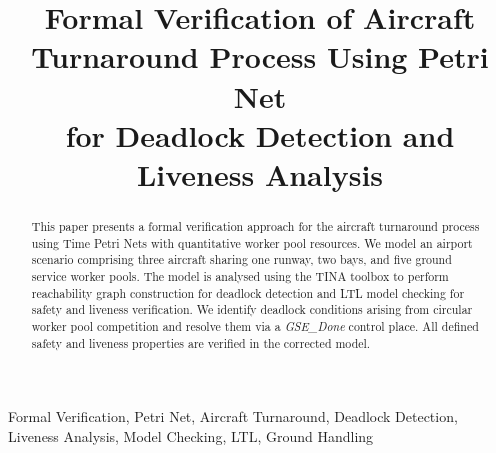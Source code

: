 \documentclass[conference]{IEEEtran}
\begin{document}
\title{Formal Verification of Aircraft Turnaround Process Using Petri Net\\
for Deadlock Detection and Liveness Analysis}

\author{
  \and
  \and
}

\maketitle

\begin{abstract}
This paper presents a formal verification approach for the aircraft turnaround
process using Time Petri Nets with quantitative worker pool resources. We model
an airport scenario comprising three aircraft sharing one runway, two bays, and
five ground service worker pools. The model is analysed using the TINA toolbox to
perform reachability graph construction for deadlock detection and LTL model
checking for safety and liveness verification. We identify deadlock conditions
arising from circular worker pool competition and resolve them via a
\textit{GSE\_Done} control place. All defined safety and liveness properties are verified in the
corrected model.
\end{abstract}

\begin{IEEEkeywords}
Formal Verification, Petri Net, Aircraft Turnaround, Deadlock Detection,
Liveness Analysis, Model Checking, LTL, Ground Handling
\end{IEEEkeywords}


\end{document}

